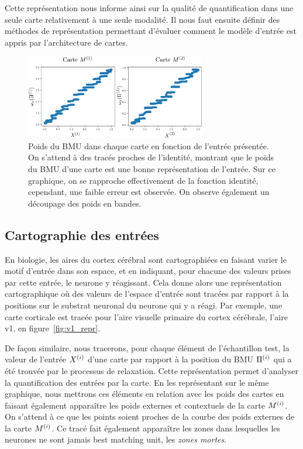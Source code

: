 Cette représentation nous informe ainsi sur la qualité de quantification dans une seule carte relativement à une seule modalité. Il nous faut ensuite définir des méthodes de représentation permettant d'évaluer comment le modèle d'entrée est appris par l'architecture de cartes.

\begin{figure}
    \centering
    \includegraphics[width=0.7\textwidth]{w_x.pdf}
    \caption{Poids du BMU dans chaque carte en fonction de l'entrée présentée. On s'attend à des tracés proches de l'identité, montrant que le poids du BMU d'une carte est une bonne représentation de l'entrée. Sur ce graphique, on se rapproche effectivement de la fonction identité, cependant, une faible erreur est observée. On observe également un découpage des poids en bandes.\label{fig:erreur}}
\end{figure}


\subsection{Cartographie des entrées}

En biologie, les aires du cortex cérébral sont cartographiées en faisant varier le motif d'entrée dans son espace, et en indiquant, pour chacune des valeurs prises par cette entrée, le neurone y réagissant. Cela donne alors une représentation cartographique où des valeurs de l'espace d'entrée sont tracées par rapport à la positions sur le substrat neuronal du neurone qui y  a réagi.
Par exemple, une carte corticale est tracée pour l'aire visuelle primaire du cortex cérébrale, l'aire v1, en figure~\ref{fig:v1_repr}.

De façon similaire, nous tracerons, pour chaque élément de l'échantillon test, la valeur de l'entrée $X^{({i})}$ d'une carte par rapport à la position du BMU $\Pi^{({i})}$ qui a été trouvée par le processus de relaxation.
Cette représentation permet d'analyser la quantification des entrées par la carte. En les représentant sur le même graphique, nous mettrons ces éléments en relation avec les poids des cartes en faisant également apparaître les poids externes et contextuels de la carte $M^{({i})}$.
On s'attend à ce que les points soient proches de la courbe des poids externes de la carte $M^{({i})}$.
Ce tracé fait également apparaître les zones dans lesquelles les neurones ne sont jamais best matching unit, les \emph{zones mortes}.

